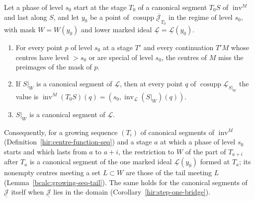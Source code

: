 \begin{theorem}
\label{mc:step-one-phase-tail}
\leanok
Let a phase of level \(s_0\) start at the stage \(T_0\) of a canonical segment \(T_0S\) of \(\operatorname{inv}^M\) and last along \(S\), and let \(y_0\) be a point of
\(\operatorname{cosupp}\overline{\underline{\mathcal J}}_{T_0}\) in the regime of level \(s_0\), with mask \(W=W(y_0)\) and lower marked ideal \(\underline{\mathcal L}=\underline{\mathcal L}(y_0)\).
\begin{enumerate}
\item For every point \(p\) of level \(s_0\) at a stage \(T'\) and every continuation \(T'M\) whose centres have level \(>s_0\) or are special of level \(s_0\), the centres
of \(M\) miss the preimages of the mask of \(p\).
\item If \(S|_W\) is a canonical segment of \(\underline{\mathcal L}\), then at every point \(q\) of \(\operatorname{cosupp}\underline{\mathcal L}_{S|_W}\) the value is
\(\operatorname{inv}^M(T_0S)(q)=(s_0,\operatorname{inv}_{\underline{\mathcal L}}(S|_W)(q))\).
\item \(S|_W\) is a canonical segment of \(\underline{\mathcal L}\).
\end{enumerate}
Consequently, for a growing sequence \((T_i)\) of canonical segments of \(\operatorname{inv}^M\) (Definition~\ref{hir:centre-function-seq}) and a stage \(a\) at which a
phase of level \(s_0\) starts and which lasts from \(a\) to \(a+i\), the restriction to \(W\) of the part of \(T_{a+i}\) after \(T_a\) is a canonical segment of the one marked
ideal \(\underline{\mathcal L}(y_0)\) formed at \(T_a\); its nonempty centres meeting a set \(L\subset W\) are those of the tail meeting \(L\) (Lemma~\ref{bcalc:growing-seq-tail}).
The same holds for the canonical segments of \(\underline{\mathcal J}\) itself when \(\underline{\mathcal J}\) lies in the domain (Corollary~\ref{hir:step-one-bridge}).
\end{theorem}
